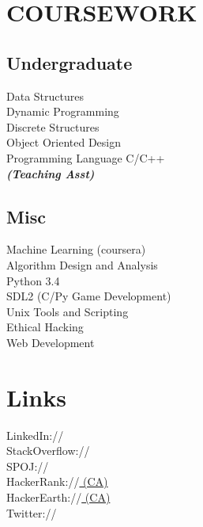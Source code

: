 \documentclass[]{sagar_resume}
\begin{document}
\begin{minipage}[t]{0.33\textwidth}
\section{COURSEWORK}

\subsection{Undergraduate}
Data Structures \\
Dynamic Programming \\
Discrete Structures \\
Object Oriented Design \\
Programming Language C/C++ \\
{\footnotesize \textit{\textbf{(Teaching Asst) }}} 
\sectionsep

\subsection{Misc}
Machine Learning (coursera)\\
Algorithm Design and Analysis\\
Python 3.4 \\
SDL2 (C/Py Game Development) \\
Unix Tools and Scripting \\
Ethical Hacking\\
Web Development
\sectionsep


\section{Links} 
LinkedIn://  \href{https://in.linkedin.com/in/sagarkar10}{} \\
StackOverflow://\href{http://stackoverflow.com/users/4192965/sagar-kar}{}\\
SPOJ:// \href{http://www.spoj.com/users/sagarkar10/}{} \\
HackerRank://\href{https://www.hackerrank.com/sagarkar10}{ (CA)} \\
HackerEarth://\href{https://www.hackerearth.com/users/sagarkar10/}{ (CA)} \\
Twitter://  \href{https://twitter.com/sagarkar10}{} \\


\end{minipage}
\end{document}
